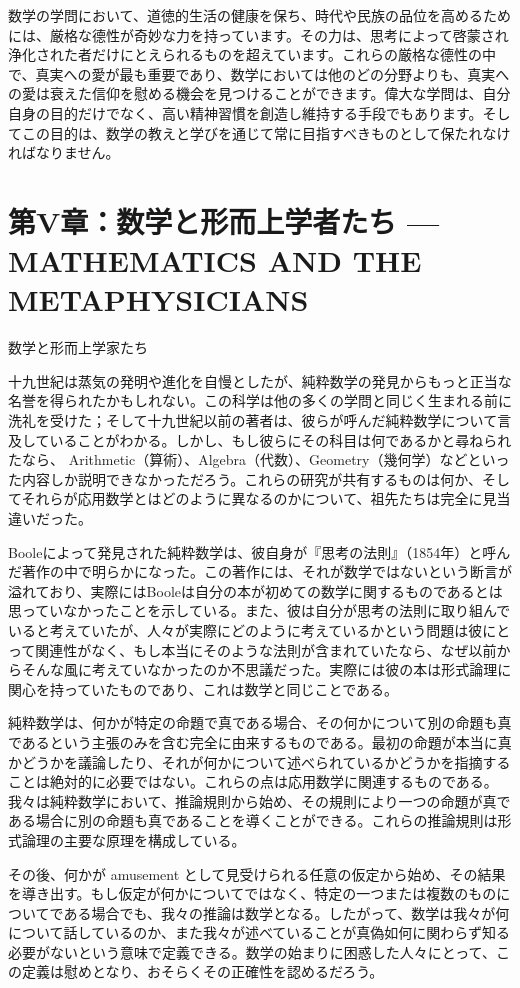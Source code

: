 \documentclass[a4paper,11pt,openany]{ltjsbook}
\begin{document}
数学の学問において、道徳的生活の健康を保ち、時代や民族の品位を高めるためには、厳格な德性が奇妙な力を持っています。その力は、思考によって啓蒙され浄化された者だけにとえられるものを超えています。これらの厳格な德性の中で、真実への愛が最も重要であり、数学においては他のどの分野よりも、真実への愛は衰えた信仰を慰める機会を見つけることができます。偉大な学問は、自分自身の目的だけでなく、高い精神習慣を創造し維持する手段でもあります。そしてこの目的は、数学の教えと学びを通じて常に目指すべきものとして保たれなければなりません。


\chapter{第V章：数学と形而上学者たち --- {MATHEMATICS AND THE METAPHYSICIANS}}

数学と形而上学家たち


十九世紀は蒸気の発明や進化を自慢としたが、純粋数学の発見からもっと正当な名誉を得られたかもしれない。この科学は他の多くの学問と同じく生まれる前に洗礼を受けた；そして十九世紀以前の著者は、彼らが呼んだ純粋数学について言及していることがわかる。しかし、もし彼らにその科目は何であるかと尋ねられたなら、 Arithmetic（算術）、Algebra（代数）、Geometry（幾何学）などといった内容しか説明できなかっただろう。これらの研究が共有するものは何か、そしてそれらが応用数学とはどのように異なるのかについて、祖先たちは完全に見当違いだった。

Booleによって発見された純粋数学は、彼自身が『思考の法則』（1854年）と呼んだ著作の中で明らかになった。この著作には、それが数学ではないという断言が溢れており、実際にはBooleは自分の本が初めての数学に関するものであるとは思っていなかったことを示している。また、彼は自分が思考の法則に取り組んでいると考えていたが、人々が実際にどのように考えているかという問題は彼にとって関連性がなく、もし本当にそのような法則が含まれていたなら、なぜ以前からそんな風に考えていなかったのか不思議だった。実際には彼の本は形式論理に関心を持っていたものであり、これは数学と同じことである。

純粋数学は、何かが特定の命題で真である場合、その何かについて別の命題も真であるという主張のみを含む完全に由来するものである。最初の命題が本当に真かどうかを議論したり、それが何かについて述べられているかどうかを指摘することは絶対的に必要ではない。これらの点は応用数学に関連するものである。我々は純粋数学において、推論規則から始め、その規則により一つの命題が真である場合に別の命題も真であることを導くことができる。これらの推論規則は形式論理の主要な原理を構成している。

その後、何かが amusement として見受けられる任意の仮定から始め、その結果を導き出す。もし仮定が何かについてではなく、特定の一つまたは複数のものについてである場合でも、我々の推論は数学となる。したがって、数学は我々が何について話しているのか、また我々が述べていることが真偽如何に関わらず知る必要がないという意味で定義できる。数学の始まりに困惑した人々にとって、この定義は慰めとなり、おそらくその正確性を認めるだろう。
\end{document}
